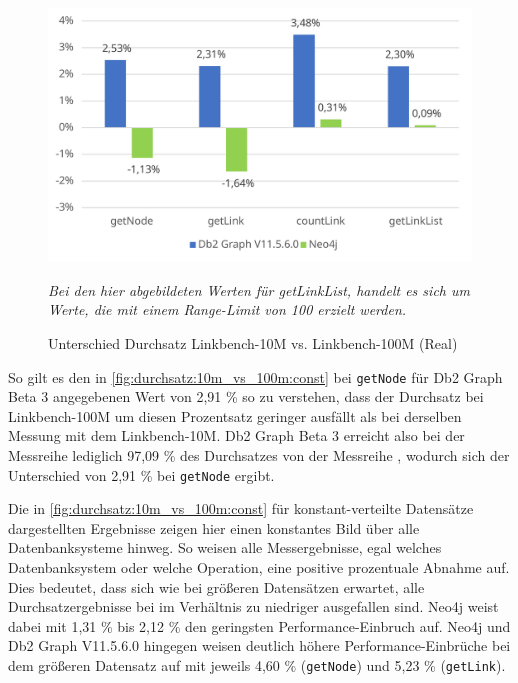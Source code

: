 \begin{figure}[!ht]
    \centering
    \includegraphics[width=\textwidth]{images/diagramme/difference_durchsatz_real_10m_vs_100m.pdf}
    \caption{Unterschied Durchsatz Linkbench-10M vs. Linkbench-100M (Real)}
    \label{fig:durchsatz:10m_vs_100m:real}
    \vspace{1em}
    \textit{Bei den hier abgebildeten Werten für getLinkList, handelt es sich um Werte, die mit einem Range-Limit von 100 erzielt werden.}
\end{figure}

So gilt es den in \autoref{fig:durchsatz:10m_vs_100m:const} bei \texttt{getNode} für Db2 Graph Beta 3 angegebenen Wert von 2,91 \% so zu verstehen, dass der Durchsatz bei Linkbench-100M um diesen Prozentsatz geringer ausfällt als bei derselben Messung mit dem Linkbench-10M. Db2 Graph Beta 3 erreicht also bei der Messreihe  lediglich 97,09 \% des Durchsatzes von der Messreihe , wodurch sich der Unterschied von 2,91 \% bei \texttt{getNode} ergibt.

Die in \autoref{fig:durchsatz:10m_vs_100m:const} für konstant-verteilte Datensätze dargestellten Ergebnisse zeigen hier einen konstantes Bild über alle Datenbanksysteme hinweg. So weisen alle Messergebnisse, egal welches Datenbanksystem oder welche Operation, eine positive prozentuale Abnahme auf. Dies bedeutet, dass sich wie bei größeren Datensätzen erwartet, alle Durchsatzergebnisse bei  im Verhältnis zu  niedriger ausgefallen sind. Neo4j weist dabei mit 1,31 \% bis 2,12 \% den geringsten Performance-Einbruch auf. Neo4j und Db2 Graph V11.5.6.0 hingegen weisen deutlich höhere Performance-Einbrüche bei dem größeren Datensatz auf mit jeweils 4,60 \% (\texttt{getNode}) und 5,23 \% (\texttt{getLink}). 

